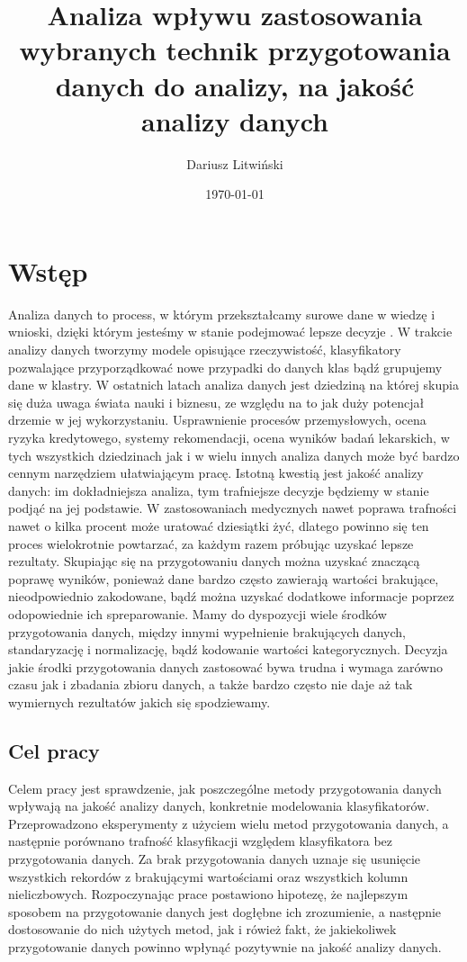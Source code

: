 \documentclass[oneside]{book}
\title{Analiza wpływu zastosowania wybranych technik przygotowania danych do analizy, na jakość analizy danych}
\author{Dariusz Litwiński}
\date{\today}
\begin{document}


\tableofcontents



\chapter*{Wstęp}


Analiza danych to process, 
w którym przekształcamy surowe dane w wiedzę i 
wnioski, dzięki którym jesteśmy w stanie podejmować lepsze decyzje \cite{data_analysis_def}.
W trakcie analizy danych tworzymy modele opisujące rzeczywistość, 
klasyfikatory pozwalające przyporządkować nowe przypadki do danych klas 
bądź grupujemy dane w klastry. W ostatnich latach analiza danych jest dziedziną 
na której skupia się duża uwaga świata nauki i biznesu, ze względu 
na to jak duży potencjał drzemie w 
jej wykorzystaniu. Usprawnienie procesów przemysłowych, 
ocena ryzyka kredytowego, systemy rekomendacji,
ocena wyników badań lekarskich, w tych wszystkich dziedzinach 
jak i w wielu innych analiza danych może być
bardzo cennym narzędziem ułatwiającym pracę. 
Istotną kwestią jest jakość analizy danych: 
im dokładniejsza analiza, tym trafniejsze decyzje będziemy w 
stanie podjąć na jej podstawie. W zastosowaniach medycznych 
nawet poprawa trafności nawet o kilka
procent może uratować dziesiątki żyć, 
dlatego powinno się ten proces wielokrotnie powtarzać, 
za każdym razem próbując uzyskać lepsze rezultaty. 
Skupiając się na przygotowaniu danych można uzyskać 
znaczącą poprawę wyników, ponieważ dane 
bardzo często zawierają wartości brakujące, nieodpowiednio zakodowane, bądź
można uzyskać dodatkowe informacje poprzez odopowiednie ich spreparowanie.
Mamy do dyspozycji wiele środków przygotowania danych, 
między innymi wypełnienie brakujących danych, standaryzację i normalizację, 
bądź kodowanie wartości kategorycznych.
Decyzja jakie środki przygotowania danych zastosować bywa trudna i wymaga zarówno 
czasu jak i zbadania zbioru danych, a także
bardzo często nie daje aż tak wymiernych rezultatów jakich się spodziewamy.

\section*{Cel pracy}
    Celem pracy jest sprawdzenie, jak poszczególne metody przygotowania danych
wpływają na jakość analizy danych, konkretnie modelowania klasyfikatorów. 
Przeprowadzono eksperymenty z użyciem wielu metod przygotowania danych, 
a następnie porównano trafność klasyfikacji względem klasyfikatora bez 
przygotowania danych. Za brak przygotowania danych uznaje się usunięcie 
wszystkich rekordów z brakującymi wartościami oraz wszystkich kolumn nieliczbowych.
Rozpoczynając prace postawiono hipotezę, że najlepszym sposobem na przygotowanie 
danych jest dogłębne ich zrozumienie, a następnie 
dostosowanie do nich użytych metod, jak i rówież fakt, że jakiekoliwek przygotowanie 
danych powinno wpłynąć pozytywnie na jakość analizy danych.
\end{document}
